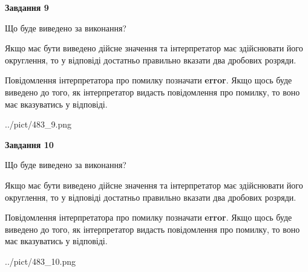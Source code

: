 \documentclass[12pt, ukrainian]{article}
\begin{document}
{\begin {Large}
{\begin {center}\textbf{Завдання 9}\end {center}}\par
Що буде виведено за виконання? \par

Якщо має бути виведено дійсне значення та інтерпретатор має здійснювати його округлення, 
то у відповіді достатньо правильно вказати два дробових розряди.

Повідомлення інтерпретатора про помилку позначати \textbf{error}.
Якщо щось буде виведено до того, як інтерпретатор видасть повідомлення про помилку, 
то воно має вказуватись у відповіді. \par

\begin{center}
	{../pict/483_9.png}
\end{center}
\newpage

{\begin {center}\textbf{Завдання 10}\end {center}}\par
Що буде виведено за виконання? \par

Якщо має бути виведено дійсне значення та інтерпретатор має здійснювати його округлення, 
то у відповіді достатньо правильно вказати два дробових розряди.

Повідомлення інтерпретатора про помилку позначати \textbf{error}.
Якщо щось буде виведено до того, як інтерпретатор видасть повідомлення про помилку, 
то воно має вказуватись у відповіді. \par

\begin{center}
	{../pict/483_10.png}
\end{center}
\newpage

\end {Large}}
\end{document}
